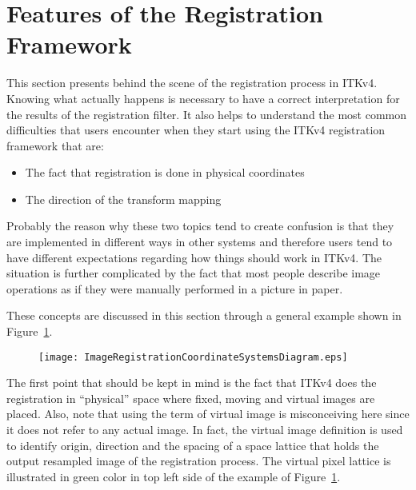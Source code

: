 \section{Features of the Registration Framework}
\label{sec:FeaturesOfTheRegistrationFramework}

This section presents behind the scene of the registration process in ITKv4.
Knowing what actually happens is necessary to have a correct interpretation
for the results of the registration filter. It also helps to understand the
most common difficulties that users encounter when they start using the ITKv4
registration framework that are:

\begin{itemize}
\item The fact that registration is done in physical coordinates
\item The direction of the transform mapping
\end{itemize}

Probably the reason why these two topics tend to create confusion is that they
are implemented in different ways in other systems and therefore users tend to
have different expectations regarding how things should work in ITKv4. The
situation is further complicated by the fact that most people describe image
operations as if they were manually performed in a picture in paper.

These concepts are discussed in this section through a general example shown in
Figure~\ref{fig:ImageRegistrationCoordinateSystemsDiagram}.

\begin{figure}
\center
\texttt{[image: ImageRegistrationCoordinateSystemsDiagram.eps]}
\label{fig:ImageRegistrationCoordinateSystemsDiagram}
\end{figure}

The first point that should be kept in mind is the fact that ITKv4 does the
registration in “physical” space where fixed, moving and virtual images are placed.
Also, note that using the term of virtual image is misconceiving here since it
does not refer to any actual image. In fact, the virtual image definition is used
to identify origin, direction and the spacing of a space lattice that holds the
output resampled image of the registration process. The virtual pixel lattice is
illustrated in green color in top left side of the example of
Figure~\ref{fig:ImageRegistrationCoordinateSystemsDiagram}.

